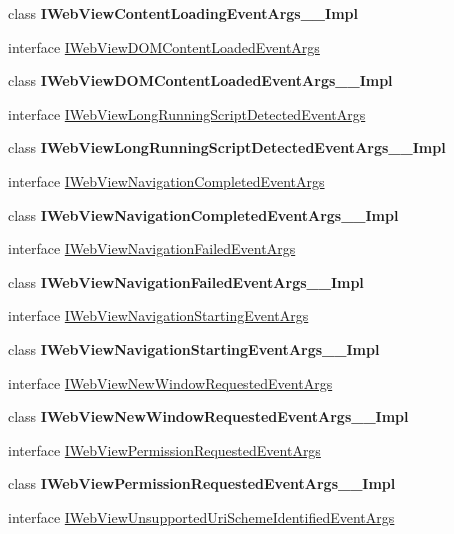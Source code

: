 \begin{DoxyCompactItemize}
class {\bfseries I\+Web\+View\+Content\+Loading\+Event\+Args\+\_\+\+\_\+\+Impl}
\item 
interface \hyperlink{interface_windows_1_1_u_i_1_1_xaml_1_1_controls_1_1_i_web_view_d_o_m_content_loaded_event_args}{I\+Web\+View\+D\+O\+M\+Content\+Loaded\+Event\+Args}
\item 
class {\bfseries I\+Web\+View\+D\+O\+M\+Content\+Loaded\+Event\+Args\+\_\+\+\_\+\+Impl}
\item 
interface \hyperlink{interface_windows_1_1_u_i_1_1_xaml_1_1_controls_1_1_i_web_view_long_running_script_detected_event_args}{I\+Web\+View\+Long\+Running\+Script\+Detected\+Event\+Args}
\item 
class {\bfseries I\+Web\+View\+Long\+Running\+Script\+Detected\+Event\+Args\+\_\+\+\_\+\+Impl}
\item 
interface \hyperlink{interface_windows_1_1_u_i_1_1_xaml_1_1_controls_1_1_i_web_view_navigation_completed_event_args}{I\+Web\+View\+Navigation\+Completed\+Event\+Args}
\item 
class {\bfseries I\+Web\+View\+Navigation\+Completed\+Event\+Args\+\_\+\+\_\+\+Impl}
\item 
interface \hyperlink{interface_windows_1_1_u_i_1_1_xaml_1_1_controls_1_1_i_web_view_navigation_failed_event_args}{I\+Web\+View\+Navigation\+Failed\+Event\+Args}
\item 
class {\bfseries I\+Web\+View\+Navigation\+Failed\+Event\+Args\+\_\+\+\_\+\+Impl}
\item 
interface \hyperlink{interface_windows_1_1_u_i_1_1_xaml_1_1_controls_1_1_i_web_view_navigation_starting_event_args}{I\+Web\+View\+Navigation\+Starting\+Event\+Args}
\item 
class {\bfseries I\+Web\+View\+Navigation\+Starting\+Event\+Args\+\_\+\+\_\+\+Impl}
\item 
interface \hyperlink{interface_windows_1_1_u_i_1_1_xaml_1_1_controls_1_1_i_web_view_new_window_requested_event_args}{I\+Web\+View\+New\+Window\+Requested\+Event\+Args}
\item 
class {\bfseries I\+Web\+View\+New\+Window\+Requested\+Event\+Args\+\_\+\+\_\+\+Impl}
\item 
interface \hyperlink{interface_windows_1_1_u_i_1_1_xaml_1_1_controls_1_1_i_web_view_permission_requested_event_args}{I\+Web\+View\+Permission\+Requested\+Event\+Args}
\item 
class {\bfseries I\+Web\+View\+Permission\+Requested\+Event\+Args\+\_\+\+\_\+\+Impl}
\item 
interface \hyperlink{interface_windows_1_1_u_i_1_1_xaml_1_1_controls_1_1_i_web_view_unsupported_uri_scheme_identified_event_args}{I\+Web\+View\+Unsupported\+Uri\+Scheme\+Identified\+Event\+Args}

\end{DoxyCompactItemize}

